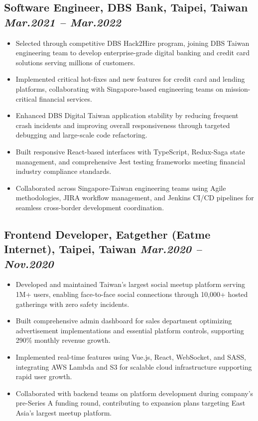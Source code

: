 \documentclass[11pt,a4paper]{article}
\newcommand{\resumeItem}[1]{\item\small{#1}}
\begin{document}
\subsection{Software Engineer, DBS Bank, Taipei, Taiwan \hfill \textit{Mar.2021 -- Mar.2022}}
\begin{itemize}[leftmargin=*, itemsep=1pt, parsep=0pt]
    \resumeItem{Selected through competitive DBS Hack2Hire program, joining DBS Taiwan engineering team to develop enterprise-grade digital banking and credit card solutions serving millions of customers.}
    \resumeItem{Implemented critical hot-fixes and new features for credit card and lending platforms, collaborating with Singapore-based engineering teams on mission-critical financial services.}
    \resumeItem{Enhanced DBS Digital Taiwan application stability by reducing frequent crash incidents and improving overall responsiveness through targeted debugging and large-scale code refactoring.}
    \resumeItem{Built responsive React-based interfaces with TypeScript, Redux-Saga state management, and comprehensive Jest testing frameworks meeting financial industry compliance standards.}
    \resumeItem{Collaborated across Singapore-Taiwan engineering teams using Agile methodologies, JIRA workflow management, and Jenkins CI/CD pipelines for seamless cross-border development coordination.}
\end{itemize}

\subsection{Frontend Developer, Eatgether (Eatme Internet), Taipei, Taiwan \hfill \textit{Mar.2020 -- Nov.2020}}
\begin{itemize}[leftmargin=*, itemsep=1pt, parsep=0pt]
    \resumeItem{Developed and maintained Taiwan's largest social meetup platform serving 1M+ users, enabling face-to-face social connections through 10,000+ hosted gatherings with zero safety incidents.}
    \resumeItem{Built comprehensive admin dashboard for sales department optimizing advertisement implementations and essential platform controls, supporting 290\% monthly revenue growth.}
    \resumeItem{Implemented real-time features using Vue.js, React, WebSocket, and SASS, integrating AWS Lambda and S3 for scalable cloud infrastructure supporting rapid user growth.}
    \resumeItem{Collaborated with backend teams on platform development during company's pre-Series A funding round, contributing to expansion plans targeting East Asia's largest meetup platform.}
\end{itemize}
\end{document}
